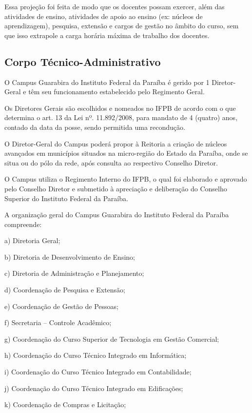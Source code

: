 Essa proje\c{c}\~ao foi feita de modo que os docentes possam exercer, al\'em das atividades de ensino, atividades de apoio ao ensino (ex: n\'ucleos de aprendizagem), pesquisa, extens\~ao e cargos de gest\~ao no \^ambito do curso, sem que isso extrapole a carga hor\'aria m\'axima de trabalho dos docentes.

\subsection{Corpo T\'ecnico-Administrativo}

O Campus Guarabira do Instituto Federal da Paraíba é gerido por 1 Diretor-Geral e têm seu funcionamento estabelecido pelo Regimento Geral.

Os Diretores Gerais são escolhidos e nomeados no IFPB de acordo com o que determina o art. 13 da Lei nº. 11.892/2008, para mandato de 4 (quatro) anos, contado da data da posse, sendo permitida uma recondução.

O Diretor-Geral do Campus poderá propor à Reitoria a criação de núcleos avançados em municípios situados na micro-região do Estado da Paraíba, onde se situa ou do pólo da rede, após consulta ao respectivo Conselho Diretor.

O Campus utiliza o Regimento Interno do IFPB, o qual foi elaborado e aprovado pelo Conselho Diretor e submetido à apreciação e deliberação do Conselho Superior do Instituto Federal da Paraíba.

A organização geral do Campus Guarabira do Instituto Federal da Paraíba compreende:

a)	Diretoria Geral;

b)	Diretoria de Desenvolvimento de Ensino;

c)	Diretoria de Administração e Planejamento;

d)	Coordenação de Pesquisa e Extensão;

e)	Coordenação de Gestão de Pessoas;

f)	Secretaria – Controle Acadêmico;

g)	Coordenação do Curso Superior de Tecnologia em Gestão Comercial;

h)	Coordenação do Curso T\'ecnico Integrado em Inform\'atica;

i)	Coordenação do Curso T\'ecnico Integrado em Contabilidade;

j)	Coordenação do Curso T\'ecnico Integrado em Edifica\c{c}\~oes;

k)      Coordena\c{c}\~ao de Compras e Licita\c{c}\~ao;

